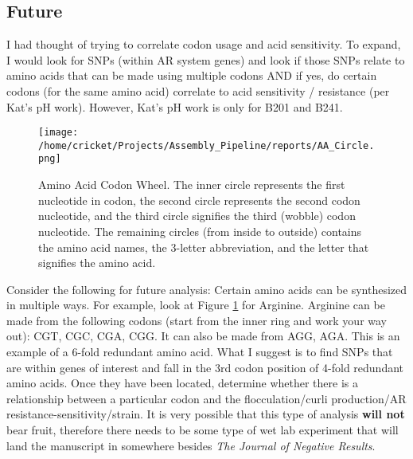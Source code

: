 \documentclass[11pt]{article}
\begin{document}
\subsection*{Future}
I had thought of trying to correlate codon usage and acid sensitivity. To expand, I would look for SNPs (within AR system genes) and look if those SNPs relate to amino acids that can be made using multiple codons AND if yes, do certain codons (for the same amino acid) correlate to acid sensitivity / resistance (per Kat's pH work). However, Kat's pH work is only for B201 and B241. 
\clearpage

\begin{figure}[h!]\normalsize %
\centering
\texttt{[image: /home/cricket/Projects/Assembly\_Pipeline/reports/AA\_Circle.png]}
\caption{Amino Acid Codon Wheel. The inner circle represents the first nucleotide in codon, the second circle represents the second codon nucleotide, and the third circle signifies the third (wobble) codon nucleotide. The remaining circles (from inside to outside) contains the amino acid names, the 3-letter abbreviation, and the letter that signifies the amino acid.}
\label{AA}
\end{figure}

Consider the following for future analysis: Certain amino acids can be synthesized in multiple ways. For example, look at Figure \ref{AA} for Arginine. Arginine can be made from the following codons (start from the inner ring and work your way out): CGT, CGC, CGA, CGG. It can also be made from AGG, AGA. This is an example of a 6-fold redundant amino acid. What I suggest is to find SNPs that are within genes of interest and fall in the 3rd codon position of 4-fold redundant amino acids. Once they have been located, determine whether there is a relationship between a particular codon and the flocculation/curli production/AR resistance-sensitivity/strain. It is very possible that this type of analysis \textbf{will not} bear fruit, therefore there needs to be some type of wet lab experiment that will land the manuscript in somewhere besides \textit{The Journal of Negative Results}.

\end{document}
